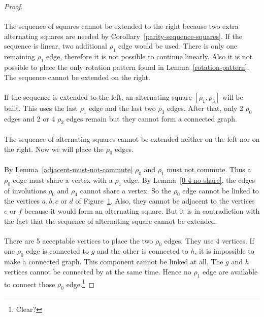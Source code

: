 \begin{proof}
\begin{figure}[H]
\begin{center}
\begin{tikzpicture}[scale=.8]
    \end{tikzpicture}
    \caption{}
    \label{proof-5-3}
  \end{center}
\end{figure}

\paragraph{}
The sequence of squares cannot be extended to the right because two extra alternating squares are needed by Corollary~\ref{parity-sequence-squares}. If the sequence is linear, two additional $\rho_1$ edge would be used. There is only one remaining $\rho_1$ edge, therefore it is not possible to continue linearly. Also it is not possible to place the only rotation pattern found in Lemma~\ref{rotation-pattern}. The sequence cannot be extended on the right.

\paragraph{}
If the sequence is extended to the left, an alternating square $[\rho_1, \rho_3]$ will be built. This uses the last $\rho_1$ edge and the last two $\rho_3$ edges. After that, only 2 $\rho_0$ edges and 2 or 4 $\rho_2$ edges remain but they cannot form a connected graph.

\paragraph{}
The sequence of alternating squares cannot be extended neither on the left nor on the right. Now we will place the $\rho_0$ edges.

\paragraph{}
By Lemma~\ref{adjacent-must-not-commute} $\rho_0$ and $\rho_1$ must not commute. Thus a $\rho_0$ edge must share a vertex with a $\rho_1$ edge. By Lemma~\ref{0-4-no-share}, the edges of involutions $\rho_0$ and $\rho_4$ cannot share a vertex. So the $\rho_0$ edge cannot be linked to the vertices $a, b, c$ or $d$ of Figure~\ref{proof-5-3}. Also, they cannot be adjacent to the vertices $e$ or $f$ because it would form an alternating square. But it is in contradiction with the fact that the sequence of alternating square cannot be extended.

\paragraph{}
There are 5 acceptable vertices to place the two $\rho_0$ edges. They use 4 vertices. If one $\rho_0$ edge is connected to $g$ and the other is connected to $h$, it is impossible to make a connected graph. This component cannot be linked at all. The $g$ and $h$ vertices cannot be connected by at the same time. Hence no $\rho_1$ edge are available to connect those $\rho_0$ edge.\footnote{Clear?}


\end{proof}
